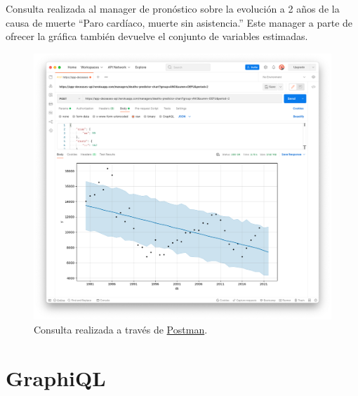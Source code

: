 Consulta realizada al manager de pronóstico sobre la evolución a 2 años de la causa de
muerte ``Paro cardíaco, muerte sin asistencia.''
Este manager a parte de ofrecer la gráfica también devuelve el conjunto de variables
estimadas.
\FloatBarrier
\begin{figure}[h]
	\centering
	\includegraphics[width=\textwidth]{doc/logos/imgs/ejemplo2.png}
	\caption{ Consulta realizada a través de \href{https://www.postman.com/}{Postman}. }
\end{figure}
\FloatBarrier

\section{GraphiQL}

